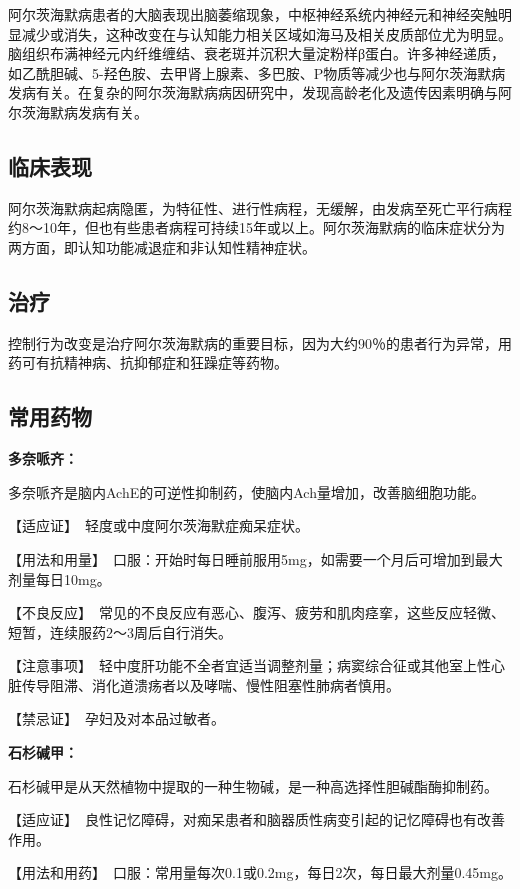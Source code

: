 阿尔茨海默病患者的大脑表现出脑萎缩现象，中枢神经系统内神经元和神经突触明显减少或消失，这种改变在与认知能力相关区域如海马及相关皮质部位尤为明显。脑组织布满神经元内纤维缠结、衰老斑并沉积大量淀粉样β蛋白。许多神经递质，如乙酰胆碱、5-羟色胺、去甲肾上腺素、多巴胺、P物质等减少也与阿尔茨海默病发病有关。在复杂的阿尔茨海默病病因研究中，发现高龄老化及遗传因素明确与阿尔茨海默病发病有关。

\subsection{临床表现}

阿尔茨海默病起病隐匿，为特征性、进行性病程，无缓解，由发病至死亡平行病程约8～10年，但也有些患者病程可持续15年或以上。阿尔茨海默病的临床症状分为两方面，即认知功能减退症和非认知性精神症状。

\subsection{治疗}

控制行为改变是治疗阿尔茨海默病的重要目标，因为大约90％的患者行为异常，用药可有抗精神病、抗抑郁症和狂躁症等药物。

\subsection{常用药物}

\textbf{多奈哌齐：}

多奈哌齐是脑内AchE的可逆性抑制药，使脑内Ach量增加，改善脑细胞功能。

【适应证】　轻度或中度阿尔茨海默症痴呆症状。

【用法和用量】　口服：开始时每日睡前服用5mg，如需要一个月后可增加到最大剂量每日10mg。

【不良反应】　常见的不良反应有恶心、腹泻、疲劳和肌肉痉挛，这些反应轻微、短暂，连续服药2～3周后自行消失。

【注意事项】　轻中度肝功能不全者宜适当调整剂量；病窦综合征或其他室上性心脏传导阻滞、消化道溃疡者以及哮喘、慢性阻塞性肺病者慎用。

【禁忌证】　孕妇及对本品过敏者。

\textbf{石杉碱甲：}

石杉碱甲是从天然植物中提取的一种生物碱，是一种高选择性胆碱酯酶抑制药。

【适应证】　良性记忆障碍，对痴呆患者和脑器质性病变引起的记忆障碍也有改善作用。

【用法和用药】　口服：常用量每次0.1或0.2mg，每日2次，每日最大剂量0.45mg。

